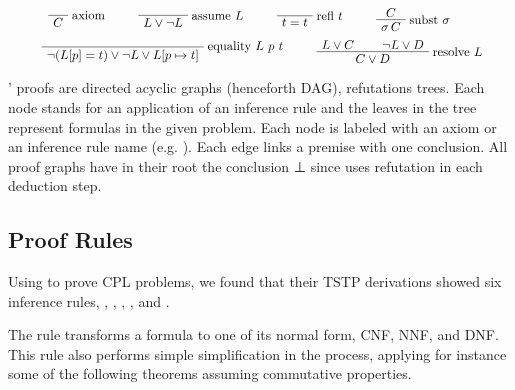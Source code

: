 \documentclass[runningheads,a4paper]{llncs}
\newenvironment{bprooftree}
  {\leavevmode\hbox\bgroup}
  {\DisplayProof\egroup}
\begin{document}
\[
\scalebox{0.9}{
\begin{bprooftree}
  \AxiomC{}
  \RightLabel{axiom}
  \UnaryInfC{$C$}
\end{bprooftree}
\qquad
\begin{bprooftree}
  \AxiomC{}
  \RightLabel{assume $L$}
  \UnaryInfC{$L \vee \neg L$}
\end{bprooftree}
\qquad
\begin{bprooftree}
  \AxiomC{}
  \RightLabel{refl $t$}
  \UnaryInfC{$t = t$}
\end{bprooftree}
\qquad
\begin{bprooftree}
  \AxiomC{$C$}
  \RightLabel{subst $\sigma$}
  \UnaryInfC{$\sigma\,C$}
\end{bprooftree}
\qquad
}
\]
\[
\scalebox{0.9}{
\begin{bprooftree}
  \AxiomC{}
  \RightLabel{equality $L$ $p$ $t$}
  \UnaryInfC{$\neg (L[p] = t) \vee \neg L \vee L[ p \mapsto t]$}
\end{bprooftree}
\qquad
\begin{bprooftree}
  \AxiomC{$L \vee C$}
  \AxiomC{$\neg L \vee D$}
  \RightLabel{resolve $L$}
  \BinaryInfC{$C \vee D$}
\end{bprooftree}
}
\]

’ proofs are directed acyclic graphs (henceforth DAG), refutations
trees. Each node stands for an application of an inference rule and the leaves
in the tree represent formulas in the given problem. Each node is labeled with
an axiom or an inference rule name (e.g. ). Each edge links a
premise with one conclusion. All proof graphs have in their root the conclusion
⊥ since  uses refutation in each deduction step.

\subsection{Proof Rules}
Using  to prove CPL problems, we found that their TSTP derivations
showed six inference rules, , , ,
,  and .

The  rule transforms a formula to one of its normal form,
CNF, NNF, and DNF. This rule also performs simple simplification in the process,
applying for instance some of the following theorems assuming commutative
properties.
\end{document}
